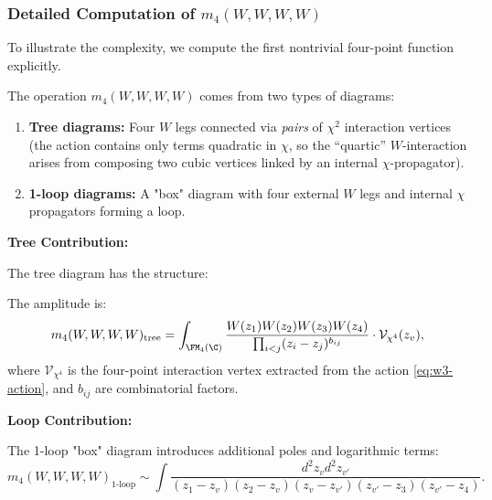 \subsubsection{Detailed Computation of $m_4(W,W,W,W)$}

To illustrate the complexity, we compute the first nontrivial four-point function explicitly.

\begin{construction}
The operation $m_4(W,W,W,W)$ comes from two types of diagrams:
\begin{enumerate}
\item \textbf{Tree diagrams:} Four $W$ legs connected via \emph{pairs} of $\chi^2$ interaction vertices (the action contains only terms quadratic in $\chi$, so the ``quartic'' $W$-interaction arises from composing two cubic vertices linked by an internal $\chi$-propagator).
\item \textbf{1-loop diagrams:} A "box" diagram with four external $W$ legs and internal $\chi$ propagators forming a loop.
\end{enumerate}
\end{construction}

\textbf{Tree Contribution:}

The tree diagram has the structure:
\begin{center}
\end{center}

The amplitude is:
\begin{equation}
m_4(W,W,W,W)_{\text{tree}} = \int_{\FM_4(\C)} \frac{W(z_1) W(z_2) W(z_3) W(z_4)}{\prod_{i<j} (z_i-z_j)^{b_{ij}}} \cdot \mathcal{V}_{\chi^4}(z_v),
\end{equation}
where $\mathcal{V}_{\chi^4}$ is the four-point interaction vertex extracted from the action \eqref{eq:w3-action}, and $b_{ij}$ are combinatorial factors.

\textbf{Loop Contribution:}

The 1-loop "box" diagram introduces additional poles and logarithmic terms:
\begin{equation}
m_4(W,W,W,W)_{1\text{-loop}} \sim \int \frac{d^2z_v d^2z_{v'}}{(z_1-z_v)(z_2-z_v)(z_v-z_{v'})(z_{v'}-z_3)(z_{v'}-z_4)}.
\end{equation}


